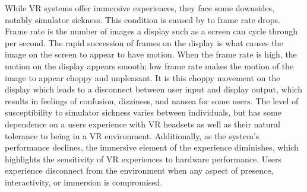 While VR systems offer immersive experiences, they face some downsides, notably simulator sickness. 
This condition is caused by to frame rate drops.
Frame rate is the number of images a display such as a screen can cycle through per second.
The rapid succession of frames on the display is what causes the image on the screen to appear to have motion.
When the frame rate is high, the motion on the display appears smooth; low frame rate makes the motion of the image to appear choppy and unpleasant.
It is this choppy movement on the display which leads to a disconnect between user input and display output, which results in feelings of confusion, dizziness, and nausea for some users. 
The level of susceptibility to simulator sickness varies between individuals, but has some dependence on a users experience with VR headsets as well as their natural tolerance to being in a VR environment.
Additionally, as the system's performance declines, the immersive element of the experience diminishes, which highlights the sensitivity of VR experiences to hardware performance. 
Users experience disconnect from the environment when any aspect of presence, interactivity, or immersion is compromised.
